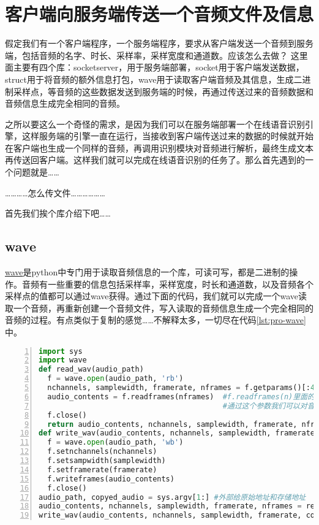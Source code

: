 \section{客户端向服务端传送一个音频文件及信息}

假定我们有一个客户端程序，一个服务端程序，要求从客户端发送一个音频到服务端，包括音频的名字、时长、采样率，采样宽度和通道数。应该怎么去做？
这里面主要有四个库：socketserver，用于服务端部署，socket用于客户端发送数据，struct用于将音频的额外信息打包，wave用于读取客户端音频及其信息，生成二进制采样点，等音频的这些数据发送到服务端的时候，再通过传送过来的音频数据和音频信息生成完全相同的音频。

之所以要这么一个奇怪的需求，是因为我们可以在服务端部署一个在线语音识别引擎，这样服务端的引擎一直在运行，当接收到客户端传送过来的数据的时候就开始在客户端也生成一个同样的音频，再调用识别模块对音频进行解析，最终生成文本再传送回客户端。这样我们就可以完成在线语音识别的任务了。那么首先遇到的一个问题就是……

…………怎么传文件………………

首先我们挨个库介绍下吧……

\subsection{wave}
\href{https://docs.python.org/zh-cn/3/library/wave.html}{wave}是python中专门用于读取音频信息的一个库，可读可写，都是二进制的操作。音频有一些重要的信息包括采样率，采样宽度，时长和通道数，以及音频各个采样点的值都可以通过wave获得。通过下面的代码，我们就可以完成一个wave读取一个音频，再重新创建一个音频文件，写入读取的音频信息生成一个完全相同的音频的过程。有点类似于复制的感觉……不解释太多，一切尽在代码\ref{lst:pro-wave}中。
\begin{lstlisting}[language = python, label={lst:pro-wave}, caption={wave库读取和写入音频}, numbers=left, 
       numberstyle=\tiny,keywordstyle=\color{blue!70},
       commentstyle=\color{red!50!green!50!blue!50},frame=shadowbox,
       rulesepcolor=\color{red!20!green!20!blue!20},basicstyle=\ttfamily]
import sys
import wave
def read_wav(audio_path)
  f = wave.open(audio_path, 'rb')
  nchannels, samplewidth, framerate, nframes = f.getparams()[:4]
  audio_contents = f.readframes(nframes)  #f.readframes(n)里面的n是帧数，
                                          #通过这个参数我们可以对音频进行裁剪
  f.close()  
  return audio_contents, nchannels, samplewidth, framerate, nframes
def write_wav(audio_contents, nchannels, samplewidth, framerate, audio_path)
  f = wave.open(audio_path, 'wb')
  f.setnchannels(nchannels)
  f.setsampwidth(samplewidth)
  f.setframerate(framerate)
  f.writeframes(audio_contents)
  f.close()
audio_path, copyed_audio = sys.argv[1:] #外部给原始地址和存储地址
audio_contents, nchannels, samplewidth, framerate, nframes = read_wav(audio_path)
write_wav(audio_contents, nchannels, samplewidth, framerate, copyed_audio)
\end{lstlisting}

